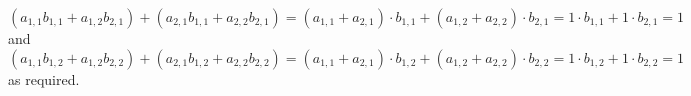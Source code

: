 \begin{exercises}
\begin{answer}
\begin{exparts}
            \begin{equation*}
              (a_{1,1}b_{1,1}+a_{1,2}b_{2,1})
              +(a_{2,1}b_{1,1}+a_{2,2}b_{2,1})
              =(a_{1,1}+a_{2,1})\cdot b_{1,1}
                +(a_{1,2}+a_{2,2})\cdot b_{2,1}
              =1\cdot b_{1,1}+1\cdot b_{2,1}
              =1
            \end{equation*}
            and
            \begin{equation*}
              (a_{1,1}b_{1,2}+a_{1,2}b_{2,2})
              +(a_{2,1}b_{1,2}+a_{2,2}b_{2,2})
              =(a_{1,1}+a_{2,1})\cdot b_{1,2}
                +(a_{1,2}+a_{2,2})\cdot b_{2,2}
              =1\cdot b_{1,2}+1\cdot b_{2,2}
              =1
            \end{equation*}
            as required.
      \end{exparts}
    \end{answer}
\end{exercises}


